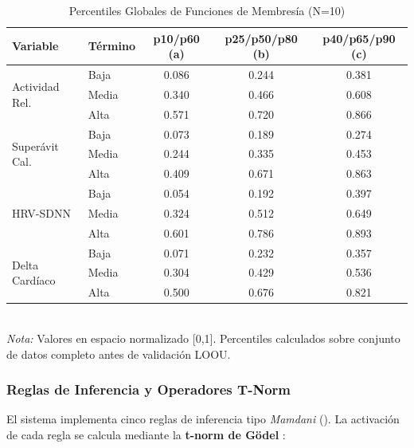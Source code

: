 \begin{table}[H]
\centering
\caption{Percentiles Globales de Funciones de Membresía (N=10)}
\label{tab:percentiles_globales}
\small
\begin{tabular}{@{}llccc@{}}
\toprule
\textbf{Variable} & \textbf{Término} & \textbf{p10/p60 (a)} & \textbf{p25/p50/p80 (b)} & \textbf{p40/p65/p90 (c)} \\
\midrule
\multirow{3}{*}{Actividad Rel.} & Baja  & 0.086 & 0.244 & 0.381 \\
                                  & Media & 0.340 & 0.466 & 0.608 \\
                                  & Alta  & 0.571 & 0.720 & 0.866 \\
\midrule
\multirow{3}{*}{Superávit Cal.} & Baja  & 0.073 & 0.189 & 0.274 \\
                                 & Media & 0.244 & 0.335 & 0.453 \\
                                 & Alta  & 0.409 & 0.671 & 0.863 \\
\midrule
\multirow{3}{*}{HRV-SDNN}       & Baja  & 0.054 & 0.192 & 0.397 \\
                                 & Media & 0.324 & 0.512 & 0.649 \\
                                 & Alta  & 0.601 & 0.786 & 0.893 \\
\midrule
\multirow{3}{*}{Delta Cardíaco} & Baja  & 0.071 & 0.232 & 0.357 \\
                                 & Media & 0.304 & 0.429 & 0.536 \\
                                 & Alta  & 0.500 & 0.676 & 0.821 \\
\bottomrule
\end{tabular}
\\[5pt]
\footnotesize{\textit{Nota:} Valores en espacio normalizado [0,1]. Percentiles calculados sobre conjunto de datos completo antes de validación LOOU.}
\end{table}

\subsubsection{Reglas de Inferencia y Operadores T-Norm}
\label{subsubsec:reglas_inferencia}

El sistema implementa cinco reglas de inferencia tipo \textit{Mamdani} (). La activación de cada regla se calcula mediante la \textbf{t-norm de Gödel} \cite{Ross2010}:

